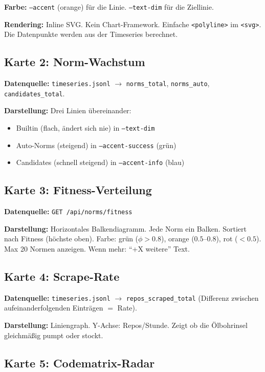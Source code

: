 \documentclass[11pt,a4paper]{article}
\begin{document}
\textbf{Farbe:} \texttt{--accent} (orange) f\"ur die Linie. 
\texttt{--text-dim} f\"ur die Ziellinie.

\textbf{Rendering:} Inline SVG. Kein Chart-Framework. 
Einfache \texttt{<polyline>} im \texttt{<svg>}. Die 
Datenpunkte werden aus der Timeseries berechnet.

\subsection{Karte 2: Norm-Wachstum}

\textbf{Datenquelle:} \texttt{timeseries.jsonl} $\to$ 
\texttt{norms\_total}, \texttt{norms\_auto}, 
\texttt{candidates\_total}.

\textbf{Darstellung:} Drei Linien \"ubereinander:
\begin{itemize}[nosep]
\item Builtin (flach, \"andert sich nie) in \texttt{--text-dim}
\item Auto-Norms (steigend) in \texttt{--accent-success} (gr\"un)
\item Candidates (schnell steigend) in \texttt{--accent-info} (blau)
\end{itemize}

\subsection{Karte 3: Fitness-Verteilung}

\textbf{Datenquelle:} \texttt{GET /api/norms/fitness}

\textbf{Darstellung:} Horizontales Balkendiagramm. Jede Norm 
ein Balken. Sortiert nach Fitness (h\"ochste oben). 
Farbe: gr\"un ($\phi > 0.8$), orange ($0.5$--$0.8$), 
rot ($< 0.5$). Max 20 Normen anzeigen. Wenn mehr: 
``+X weitere'' Text.

\subsection{Karte 4: Scrape-Rate}

\textbf{Datenquelle:} \texttt{timeseries.jsonl} $\to$ 
\texttt{repos\_scraped\_total} (Differenz zwischen 
aufeinanderfolgenden Eintr\"agen $=$ Rate).

\textbf{Darstellung:} Liniengraph. Y-Achse: Repos/Stunde. 
Zeigt ob die \"Olbohrinsel gleichm\"a{\ss}ig pumpt oder 
stockt.

\subsection{Karte 5: Codematrix-Radar}
\end{document}
